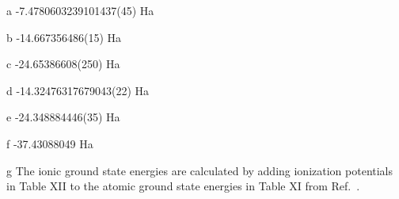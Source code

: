 \begin{table*}[t!]
\begin{threeparttable}
\begin{tablenotes}
\item[a] -7.4780603239101437(45) Ha
\item[b] -14.667356486(15) Ha
\item[c] -24.65386608(250) Ha
\item[d] -14.32476317679043(22) Ha
\item[e] -24.348884446(35) Ha
\item[f] -37.43088049 Ha
\item[g] The ionic ground state energies are calculated by adding ionization potentials in Table XII to the atomic ground state energies in Table XI from Ref.~\cite{Davidson_Atoms}.
\end{tablenotes}

\end{threeparttable}
\end{table*}